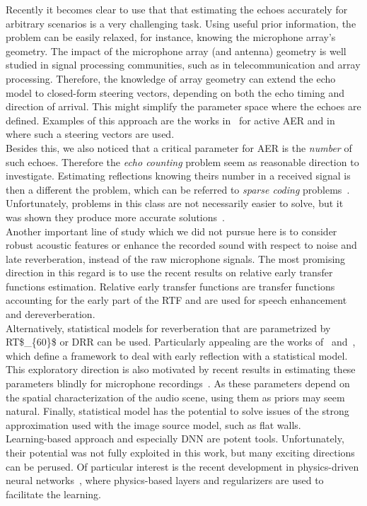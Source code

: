 Recently it becomes clear to use that that estimating the echoes accurately for arbitrary scenarios is a very challenging task.
Using useful prior information, the problem can be easily relaxed, for instance, knowing the microphone array's geometry.
The impact of the microphone array (and antenna) geometry is well studied in signal processing communities, such as in telecommunication and array processing.
Therefore, the knowledge of array geometry can extend the echo model to closed-form steering vectors, depending on both the echo timing and direction of arrival.
This might simplify the parameter space where the echoes are defined.
Examples of this approach are the works in~ for active \acf{AER} and in  where such a steering vectors are used.
\\Besides this, we also noticed that a critical parameter for \ac{AER} is the \textit{number} of such echoes.
Therefore the \textit{echo counting} problem seem as reasonable direction to investigate.
Estimating reflections knowing theirs number in a received signal is then a different the problem, which can be  referred to \textit{sparse coding} problems~.
Unfortunately, problems in this class are not necessarily easier to solve, but it was shown they produce more accurate solutions~.
\\Another important line of study which we did not pursue here is to consider robust acoustic features or enhance the recorded sound with respect to noise and late reverberation, instead of the raw microphone signals.
The most promising direction in this regard is to use the recent results on relative early transfer functions estimation.
Relative early transfer functions are transfer functions accounting for the early part of the \ac{RTF} and are used for speech enhancement and dereverberation.
\\Alternatively, statistical models for reverberation that are parametrized by \ac{RT$_{60}$} or \acf{DRR} can be used.
Particularly appealing are the works of~\citeauthor{leglaive2015multichannel} and~\citeauthor{badeau2019common}, which define a framework to deal with early reflection with a statistical model.
This exploratory direction is also motivated by recent results in estimating these parameters blindly for microphone recordings~.
As these parameters depend on the spatial characterization of the audio scene, using them as priors may seem natural.
Finally, statistical model has the potential to solve issues of the strong approximation used with the image source model, such as flat walls.
\\Learning-based approach and especially \acf{DNN} are potent tools.
Unfortunately, their potential was not fully exploited in this work, but many exciting directions can be perused.
Of particular interest is the recent development in physics-driven neural networks~,
where physics-based layers and regularizers are used to facilitate the learning.


